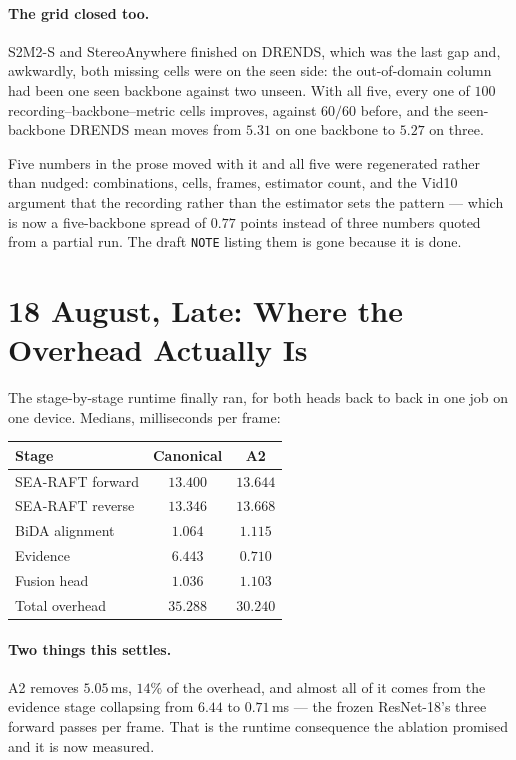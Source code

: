 \documentclass[11pt,a4paper]{article}
\begin{document}
\paragraph{The grid closed too.} S2M2-S and StereoAnywhere finished on DRENDS,
which was the last gap and, awkwardly, both missing cells were on the seen side:
the out-of-domain column had been one seen backbone against two unseen. With all
five, every one of $100$ recording--backbone--metric cells improves, against
$60/60$ before, and the seen-backbone DRENDS mean moves from $5.31$ on one
backbone to $5.27$ on three.

Five numbers in the prose moved with it and all five were regenerated rather than
nudged: combinations, cells, frames, estimator count, and the Vid10 argument that
the recording rather than the estimator sets the pattern --- which is now a
five-backbone spread of $0.77$ points instead of three numbers quoted from a
partial run. The draft \texttt{NOTE} listing them is gone because it is done.


\section*{18 August, Late: Where the Overhead Actually Is}

The stage-by-stage runtime finally ran, for both heads back to back in one job on
one device. Medians, milliseconds per frame:

\begin{center}
\begin{tabular}{lcc}
\toprule
Stage & Canonical & A2 \\
\midrule
SEA-RAFT forward   & $13.400$ & $13.644$ \\
SEA-RAFT reverse   & $13.346$ & $13.668$ \\
BiDA alignment     & $1.064$  & $1.115$ \\
Evidence           & $6.443$  & $\mathbf{0.710}$ \\
Fusion head        & $1.036$  & $1.103$ \\
\midrule
Total overhead     & $35.288$ & $\mathbf{30.240}$ \\
\bottomrule
\end{tabular}
\end{center}

\paragraph{Two things this settles.} A2 removes $5.05$\,ms, $14\%$ of the
overhead, and almost all of it comes from the evidence stage collapsing from
$6.44$ to $0.71$\,ms --- the frozen ResNet-18's three forward passes per frame.
That is the runtime consequence the ablation promised and it is now measured.
\end{document}
